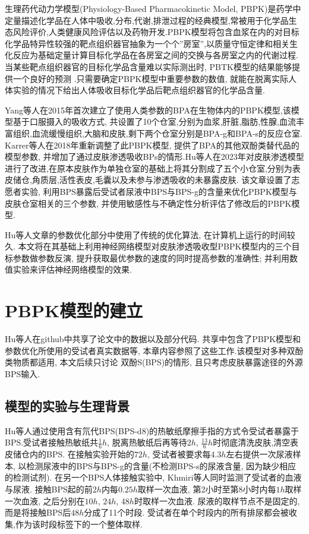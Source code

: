 \documentclass[a4paper,punct=banjiao,twoside]{ctexrep}
\theoremstyle{plain}
\theoremstyle{definition}
\theoremstyle{remark}
\begin{document}
生理药代动力学模型(Physiology-Based Pharmacokinetic Model, PBPK)是药学中定量描述化学品在人体中吸收,分布,代谢,排泄过程的经典模型,常被用于化学品生态风险评价,人类健康风险评估以及药物开发\cite{7}.PBPK模型将包含血浆在内的对目标化学品特异性较强的靶点组织器官抽象为一个个”房室”,以质量守恒定律和相关生化反应为基础定量计算目标化学品在各房室之间的交换与各房室之内的代谢过程\cite{8}.当某些靶点组织器官的目标化学品含量难以实际测出时, PBTK模型的结果能够提供一个良好的预测 \cite{7}.只需要确定PBPK模型中重要参数的数值, 就能在脱离实际人体实验的情况下给出人体吸收目标化学品后靶点组织器官的化学品含量.

Yang等人在2015年首次建立了使用人类参数的BPA在生物体内的PBPK模型,该模型基于口服摄入的吸收方式, 共设置了10个仓室,分别为血浆,肝脏,脂肪,性腺,血流丰富组织,血流缓慢组织,大脑和皮肤,剩下两个仓室分别是BPA-g和BPA-s的反应仓室\cite{10}. Karrer等人在2018年重新调整了此PBPK模型, 提供了BPA的其他双酚类替代品的模型参数, 并增加了通过皮肤渗透吸收BPs的情形\cite{9}.Hu等人在2023年对皮肤渗透模型进行了改进,在原本皮肤作为单独仓室的基础上将其分割成了五个小仓室,分别为表皮储仓,角质层,活性表皮,毛囊以及未参与渗透吸收的未暴露皮肤\cite{11}.
该文章设置了志愿者实验, 利用BPS暴露后受试者尿液中BPS与BPS-g的含量来优化PBPK模型与皮肤仓室相关的三个参数, 并使用敏感性与不确定性分析评估了修改后的PBPK模型.

Hu等人文章的参数优化部分中使用了传统的优化算法, 在计算机上运行的时间较久. 本文将在其基础上利用神经网络模型对皮肤渗透吸收型PBPK模型内的三个目标参数做参数反演, 提升获取最优参数的速度的同时提高参数的准确性; 并利用数值实验来评估神经网络模型的效果.


\chapter{PBPK模型的建立}
Hu等人\cite{11}在github中共享了论文中的数据以及部分代码\cite{12}. 共享中包含了PBPK模型和参数优化所使用的受试者真实数据等, 本章内容参照了这些工作.该模型对多种双酚类物质都适用, 本文后续只讨论
双酚S(BPS)的情形, 且只考虑皮肤暴露途径的外源BPS输入.
\section{模型的实验与生理背景}
Hu\cite{11}等人通过使用含有氘代BPS(BPS-d8)的热敏纸摩擦手指的方式令受试者暴露于BPS.受试者接触热敏纸共$\frac{1}{6}h$, 脱离热敏纸后再等待$2h$, $\frac{13}{6}h$时彻底清洗皮肤,清空表皮储仓内的BPS.
在接触实验开始的$72h$, 受试者被要求每$4.3h$左右提供一次尿液样本, 以检测尿液中的BPS与BPS-g的含量(不检测BPS-s的尿液含量, 因为缺少相应的检测试剂).
在另一个BPS人体接触实验中, Khmiri等人\cite{13}同时监测了受试者的血液与尿液. 接触BPS起的前$2h$内每$0.25h$取样一次血液, 第2小时至第8小时内每$1h$取样一次血液, 之后分别在$10h$, $24h$, $48h$时取样一次血液.
尿液的取样节点不是固定的, 而是将接触BPS后$48h$分成了11个时段. 受试者在单个时段内的所有排尿都会被收集,作为该时段标签下的一个整体取样. 
\end{document}
